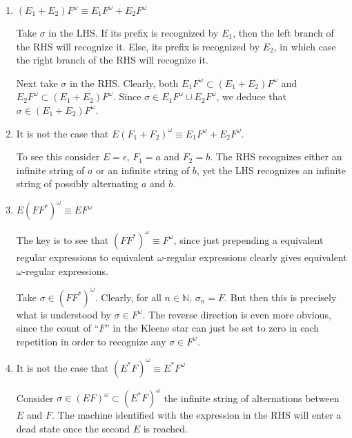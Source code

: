 \documentclass[letterpaper,11pt]{article}
\newcommand{\N}{\mathbb{N}}
\newcommand{\union}{\cup}
\newcommand{\enumalpha}{\renewcommand\labelenumi{(\alph{enumi})}}
\begin{document}
\begin{enumerate}
        \enumalpha
    \item $(E_1 + E_2)F^\omega \equiv E_1 F^\omega + E_2 F^\omega$

        Take $\sigma$ in the LHS. If its prefix is recognized by $E_1$, then
        the left branch of the RHS will recognize it. Else, its prefix is
        recognized by $E_2$, in which case the right branch of the RHS will
        recognize it.

        Next take $\sigma$ in the RHS. Clearly, both
        $E_1 F^\omega \subset (E_1 + E_2) F^\omega$ and
        $E_2 F^\omega \subset (E_1 + E_2) F^\omega$.
        Since $\sigma \in E_1 F^\omega \union E_2 F^\omega$, we deduce that
        $\sigma \in (E_1 + E_2) F^\omega$.

    \item It is not the case that
        $E (F_1 + F_2)^\omega \equiv E_1 F^\omega + E_2 F^\omega$.

        To see this consider $E = \epsilon$, $F_1 = a$ and $F_2 = b$. The RHS
        recognizes either an infinite string of $a$ or an infinite string of
        $b$, yet the LHS recognizes an infinite string of possibly alternating
        $a$ and $b$.

    \item $E (F F^*)^\omega \equiv E F^\omega$

        The key is to see that $(F F^*)^\omega \equiv F^\omega$, since just
        prepending a equivalent regular expressions to equivalent
        $\omega$-regular expressions clearly gives equivalent $\omega$-regular
        expressions.

        Take $\sigma \in (F F^*)^\omega$. Clearly, for all $n \in \N$,
        $\sigma_n = F$. But then this is precisely what is understood by
        $\sigma \in F^\omega$. The reverse direction is even more obvious,
        since the count of ``$F$'' in the Kleene star can just be set to zero
        in each repetition in order to recognize any $\sigma \in F^\omega$.

    \item It is not the case that
        $(E^* F)^\omega \equiv E^* F^\omega$

        Consider $\sigma \in (E F)^\omega \subset (E^* F)^\omega$ the infinite
        string of alternations between $E$ and $F$. The machine identified with
        the expression in the RHS will enter a dead state once the second $E$
        is reached.
\end{enumerate}

\end{document}
